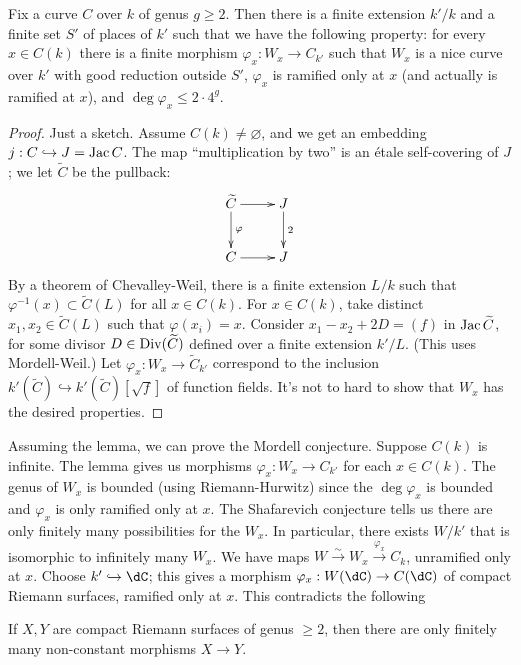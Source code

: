 \begin{lemma}[technical]
Fix a curve $C$ over $k$ of genus $g\geqslant 2$. Then there is a finite 
extension $k'/k$ and a finite set $S'$ of places of $k'$ such that we have the 
following property: for every $x\in C(k)$ there is a finite morphism 
$\varphi_x:W_x \to C_{k'}$ such that $W_x$ is a nice curve over $k'$ with good 
reduction outside $S'$, $\varphi_x$ is ramified only at $x$ (and actually is 
ramified at $x$), and $\deg\varphi_x \leqslant 2\cdot 4^g$. 
\end{lemma}
\begin{proof}
Just a sketch. Assume $C(k)\ne \varnothing$, and we get an embedding 
$j:C\hookrightarrow J=\operatorname{Jac} C$. The map ``multiplication by two'' is an 
\'etale self-covering of $J$; we let $\widetilde C$ be the pullback: 
\[\xymatrix{
  \widetilde C \ar[r] \ar[d]^-\varphi 
    & J \ar[d]^-2 \\
  C \ar[r] 
    & J 
}\]
By a theorem of Chevalley-Weil, there is a finite extension $L/k$ such that 
$\varphi^{-1}(x)\subset \widetilde C(L)$ for all $x\in C(k)$. For 
$x\in C(k)$, take distinct $x_1,x_2\in \widetilde C(L)$ such that 
$\varphi(x_i)=x$. Consider $x_1-x_2+2 D=(f)$ in $\operatorname{Jac}{\widetilde C}$, for 
some divisor $D\in \operatorname{Div}(\widetilde C)$ defined over a finite extension 
$k'/L$. (This uses Mordell-Weil.) Let 
$\varphi_x:W_x \to \widetilde C_{k'}$ correspond to the inclusion 
$k'(\widetilde C)\hookrightarrow k'(\widetilde C)[\sqrt f]$ of function 
fields. It's not to hard to show that $W_x$ has the desired properties. 
\end{proof}

Assuming the lemma, we can prove the Mordell conjecture. Suppose $C(k)$ is 
infinite. The lemma gives us morphisms $\varphi_x:W_x \to C_{k'}$ for each 
$x\in C(k)$. The genus of $W_x$ is bounded (using Riemann-Hurwitz) since the 
$\deg\varphi_x$ is bounded and $\varphi_x$ is only ramified only at $x$. 
The Shafarevich conjecture tells us there are only finitely many possibilities 
for the $W_x$. In particular, there exists $W/k'$ that is isomorphic to 
infinitely many $W_x$. We have maps 
$W\xrightarrow\sim W_x \xrightarrow{\varphi_x} C_k$, unramified only at $x$. 
Choose $k'\hookrightarrow\dC$; this gives a morphism 
$\varphi_x:W(\dC) \to C(\dC)$ of compact Riemann surfaces, ramified only at 
$x$. This contradicts the following 

\begin{theorem}[de Franchis, 1913]
If $X,Y$ are compact Riemann surfaces of genus $\geqslant 2$, then there are 
only finitely many non-constant morphisms $X\to Y$. 
\end{theorem}









